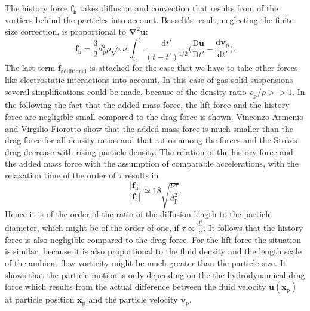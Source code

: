\documentclass[11pt,a4paper,openany,oneside,parskip=half*]{article}
\renewcommand*\vec[1]{\boldsymbol{#1}}
\begin{document}
The history force $\vec{f}_\mathrm{h}$ takes diffusion and convection that results from of the vortices behind the particles into account. Basselt's result, neglecting the finite size correction, is proportional to $\vec\nabla^\mathrm{2}\vec{u}$:
\begin{equation}
\vec{f}_\mathrm{h} = \frac{3}{2}d_\mathrm{p}^\mathrm{2}\rho\sqrt{\pi\nu}\int_{t_\mathrm{0}}^{t} \frac{\mathrm{d}t'}{(t-t')^\mathrm{1/2}} \biggl(\frac{\mathrm{D}\vec{u}}{\mathrm{D}t'}- \frac{\mathrm{d}\vec{v}_\mathrm{p}}{\mathrm{d}t'}\biggl).  
\end{equation}
The last term $\vec{f}_\mathrm{additional}$ is attached for the case that we have to take other forces like electrostatic interactions into account.
In this case of gas-solid suspensions several simplifications could be made, because of the density ratio $\rho_\mathrm{p}/\rho >> 1$.
\newline
In the following the fact that the added mass force, the lift force and the history force are negligible small compared to the drag force is shown.
Vincenzo Armenio and Virgilio Fiorotto \cite{TheImportanceOfTheFocusActingOnParticlesInTurbulentFlows} show that the added mass force is much smaller than the drag force for all density ratios and that ratios among the forces and the Stokes drag decrease with rising particle density.
The relation of the history force and the added mass force with the assumption of comparable accelerations, with the relaxation time of the order of $\tau$ results in
\begin{equation}
\frac{|\vec{f}_\mathrm{h}|}{|\vec{f}_\mathrm{a}|}\simeq 18 \sqrt{\frac{\nu\tau}{d_\mathrm{p}^\mathrm{2}}}.
\end{equation}
Hence it is of the order of the ratio of the diffusion length to the particle diameter, which might be of the order of one, if $\tau \propto \frac{d_\mathrm{p}^\mathrm{2}}{\nu}$.
It follows that the history force is also negligible compared to the drag force.
For the lift force the situation is similar, because it is also proportional to the fluid density and the length scale of the ambient flow vorticity might be much greater than the particle size.
It shows that the particle motion is only depending on the the hydrodynamical drag force which results from the actual difference between the fluid velocity $\vec{u}(\vec{x}_\mathrm{p})$ at particle position $\vec{x}_\mathrm{p}$ and the particle velocity $\vec{v}_\mathrm{p}$.
\end{document}
